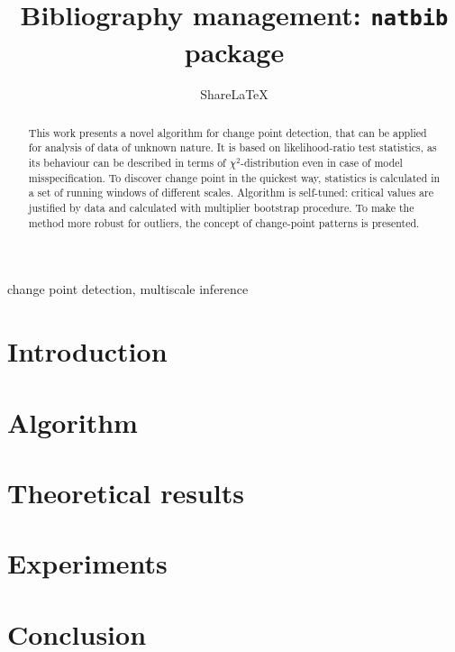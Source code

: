 \documentclass{style/llncs}
\title{Bibliography management: \texttt{natbib} package}
\author{Share\LaTeX}
\begin{document}
\maketitle
\begin{abstract}
This work presents a novel algorithm for change point detection, that can be applied for analysis of data of unknown nature. It is based on likelihood-ratio test statistics, as its behaviour can be described in terms of $\chi^2$-distribution even in case of model misspecification. To discover change point in the quickest way, statistics is calculated in a set of running windows of different scales. Algorithm is self-tuned: critical values are justified by data and calculated with multiplier bootstrap procedure. To make the method more robust for outliers, the concept of change-point patterns is presented.   
\end{abstract}

\begin{keywords} change point detection, multiscale inference
\end{keywords}

\newpage

\section{Introduction}


%

\onecolumn
\section{Algorithm}

%


\onecolumn
\section{Theoretical results}
 

\onecolumn
\section{Experiments}



\section{Conclusion}




{}

\end{document}
